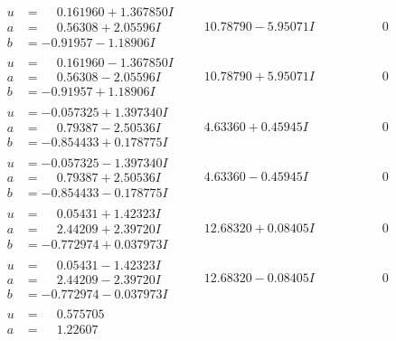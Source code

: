 \documentclass[1p]{elsarticle_modified}
\theoremstyle{definition}
\begin{document}
$$\begin{array}{c|c|c}
 \hline 
\begin{aligned}
u &= \phantom{-}0.161960 + 1.367850 I \\
a &= \phantom{-}0.56308 + 2.05596 I \\
b &= -0.91957 - 1.18906 I\end{aligned}
 & \phantom{-}10.78790 - 5.95071 I & \phantom{-0.000000 } 0 \\ \hline\begin{aligned}
u &= \phantom{-}0.161960 - 1.367850 I \\
a &= \phantom{-}0.56308 - 2.05596 I \\
b &= -0.91957 + 1.18906 I\end{aligned}
 & \phantom{-}10.78790 + 5.95071 I & \phantom{-0.000000 } 0 \\ \hline\begin{aligned}
u &= -0.057325 + 1.397340 I \\
a &= \phantom{-}0.79387 - 2.50536 I \\
b &= -0.854433 + 0.178775 I\end{aligned}
 & \phantom{-}4.63360 + 0.45945 I & \phantom{-0.000000 } 0 \\ \hline\begin{aligned}
u &= -0.057325 - 1.397340 I \\
a &= \phantom{-}0.79387 + 2.50536 I \\
b &= -0.854433 - 0.178775 I\end{aligned}
 & \phantom{-}4.63360 - 0.45945 I & \phantom{-0.000000 } 0 \\ \hline\begin{aligned}
u &= \phantom{-}0.05431 + 1.42323 I \\
a &= \phantom{-}2.44209 + 2.39720 I \\
b &= -0.772974 + 0.037973 I\end{aligned}
 & \phantom{-}12.68320 + 0.08405 I & \phantom{-0.000000 } 0 \\ \hline\begin{aligned}
u &= \phantom{-}0.05431 - 1.42323 I \\
a &= \phantom{-}2.44209 - 2.39720 I \\
b &= -0.772974 - 0.037973 I\end{aligned}
 & \phantom{-}12.68320 - 0.08405 I & \phantom{-0.000000 } 0 \\ \hline\begin{aligned}
u &= \phantom{-}0.575705\phantom{ +0.000000I} \\
a &= \phantom{-}1.22607\phantom{ +0.000000I} \\

\end{aligned}
\end{array}$$
\end{document}
